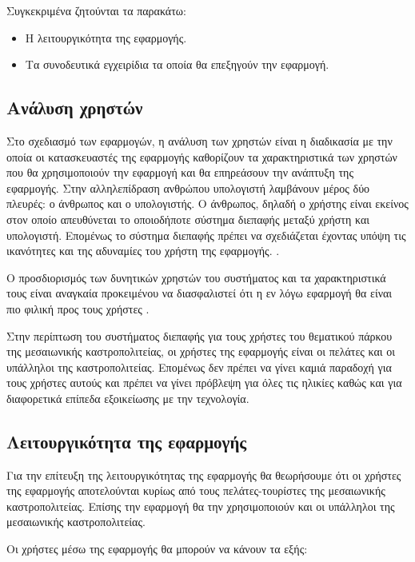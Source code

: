 \documentclass{assignment}
\begin{document}
Συγκεκριμένα ζητούνται τα παρακάτω:

\begin{itemize}
\item Η λειτουργικότητα της εφαρμογής.
\item Τα συνοδευτικά εγχειρίδια τα οποία θα επεξηγούν την εφαρμογή.
\end{itemize}

\subsection{Ανάλυση χρηστών}

Στο σχεδιασμό των εφαρμογών, η ανάλυση των χρηστών είναι η διαδικασία με την οποία οι κατασκευαστές της εφαρμογής καθορίζουν τα χαρακτηριστικά των χρηστών που θα χρησιμοποιούν την εφαρμογή και θα επηρεάσουν την ανάπτυξη της εφαρμογής. Στην αλληλεπίδραση ανθρώπου υπολογιστή λαμβάνουν μέρος δύο πλευρές: ο άνθρωπος και ο υπολογιστής. Ο άνθρωπος, δηλαδή ο χρήστης είναι εκείνος στον οποίο απευθύνεται το οποιοδήποτε σύστημα διεπαφής μεταξύ χρήστη και υπολογιστή. Επομένως το σύστημα διεπαφής πρέπει να σχεδιάζεται έχοντας υπόψη τις ικανότητες και της αδυναμίες του χρήστη της εφαρμογής. \cite{wiki:user_analysis,class_notes}.

Ο προσδιορισμός των δυνητικών χρηστών του συστήματος και τα χαρακτηριστικά τους είναι αναγκαία προκειμένου να διασφαλιστεί ότι η εν λόγω εφαρμογή θα είναι πιο φιλική προς τους χρήστες \cite{wiki:user_analysis}.

Στην περίπτωση του συστήματος διεπαφής για τους χρήστες του θεματικού πάρκου της μεσαιωνικής καστροπολιτείας, οι χρήστες της εφαρμογής είναι οι πελάτες και οι υπάλληλοι της καστροπολιτείας. Επομένως δεν πρέπει να γίνει καμιά παραδοχή για τους χρήστες αυτούς και πρέπει να γίνει πρόβλεψη για όλες τις ηλικίες καθώς και για διαφορετικά επίπεδα εξοικείωσης με την τεχνολογία. 

\subsection{Λειτουργικότητα της εφαρμογής}

Για την επίτευξη της λειτουργικότητας της εφαρμογής θα θεωρήσουμε ότι οι χρήστες της εφαρμογής αποτελούνται κυρίως από τους πελάτες-τουρίστες της μεσαιωνικής καστροπολιτείας. Επίσης την εφαρμογή θα την χρησιμοποιούν και οι υπάλληλοι της μεσαιωνικής καστροπολιτείας.


Οι χρήστες μέσω της εφαρμογής θα μπορούν να κάνουν τα εξής:
\end{document}
